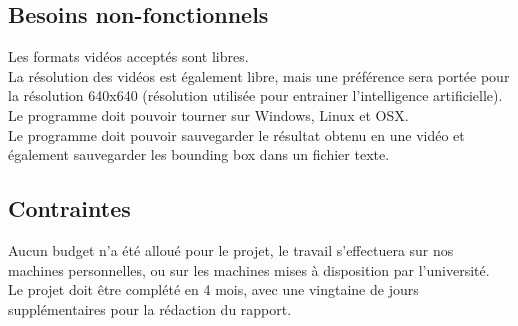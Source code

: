 \subsection{Besoins non-fonctionnels}
Les formats vidéos acceptés sont libres.\\
La résolution des vidéos est également libre, mais une préférence sera portée pour la résolution 640x640 (résolution utilisée pour entrainer l'intelligence artificielle).\\
Le programme doit pouvoir tourner sur Windows, Linux et OSX.\\
Le programme doit pouvoir sauvegarder le résultat obtenu en une vidéo et également sauvegarder les bounding box dans un fichier texte.\\

\subsection{Contraintes}
Aucun budget n'a été alloué pour le projet, le travail s'effectuera sur nos machines personnelles, ou sur les machines mises à disposition par l'université.\\
Le projet doit être complété en 4 mois, avec une vingtaine de jours supplémentaires pour la rédaction du rapport.\\


\clearpage
